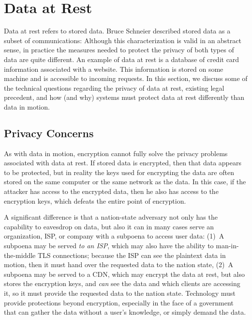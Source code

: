 \section{Data at Rest}
\label{sec:rest}

Data at rest refers to stored data. Bruce Schneier described stored data as a
subset of communications:  Although
this characterization is valid in an abstract sense, in practice the measures needed
to protect the privacy of both types of data are quite different.  An example
of data at rest is a database of credit card information associated with a
website. This information is stored on some machine and is accessible to
incoming requests. In this section, we discuss some of the technical questions
regarding the privacy of data at rest, existing legal precedent, and how (and
why) systems must protect data at rest differently than data in motion.

\subsection{Privacy Concerns}  

As with data in motion, encryption cannot fully solve the privacy problems
associated with data at rest.  If stored data is encrypted, then that data
appears to be protected, but in reality the keys used for encrypting the data
are often stored on the same computer or the same network as the data.  In
this case, if the attacker has access to the encrypted data, then he also has
access to the encryption keys, which defeats the entire point of encryption.

A significant difference is that a nation-state adversary not only has the
capability to eavesdrop on data, but also it can in many cases serve an
organization, ISP, or company with a subpoena to access user data: (1)~A
subpoena may be served {\em to an ISP}, which may also have the ability to
man-in-the-middle TLS connections; because the ISP can see the plaintext data
in motion, then it must hand over the requested data to the nation state,
(2)~A subpoena may be served to a CDN, which may encrypt the data at rest, but
also stores the encryption keys, and {\it can} see the data and which clients
are accessing it, so it must provide the requested data to the nation state.
Technology must provide protections beyond encryption, especially in the face of a
government that can gather the data without a user's knowledge, or simply
demand the data.

